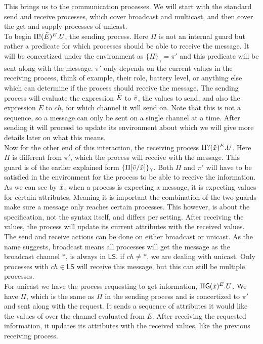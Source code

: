 This brings us to the communication processes. We will start with the standard send and receive processes, which cover broadcast and multicast, and then cover the get and supply processes of unicast.\\
To begin $\Pi ! (\Tilde{E})^{E}.U$, the sending process. Here $\Pi$ is not an internal guard but rather a predicate for which processes should be able to receive the message. It will be concertized under the environment as $\{ \Pi \}_{\gamma} = \pi'$ and this predicate will be sent along with the message. $\pi '$ only depends on the current values in the receiving process, think of example, their role, battery level, or anything else which can determine if the process should receive the message. The sending process will evaluate the expression $\Tilde{E}$ to $\Tilde{v}$, the values to send, and also the expression $E$ to $ch$, for which channel it will send on. Note that this is not a sequence, so a message can only be sent on a single channel at a time. After sending it will proceed to update its environment about which we will give more details later on what this means.\\
Now for the other end of this interaction, the receiving process $\Pi ? (\Tilde{x})^{E}.U$. Here $\Pi$ is different from $\pi '$, which the process will receive with the message. This guard is of the earlier explained form $\{ \Pi [\Tilde{v}/ \Tilde{x}] \}_{\gamma}$. Both $\Pi$ and $\pi '$ will have to be satisfied in the environment for the process to be able to receive the information. As we can see by $\Tilde{x}$, when a process is expecting a message, it is expecting values for certain attributes. Meaning it is important the combination of the two guards make sure a message only reaches certain processes. This however, is about the specification, not the syntax itself, and differs per setting. After receiving the values, the process will update its current attributes with the received values.\\
The send and receive actions can be done on either broadcast or unicast. As the name suggests, broadcast means all processes will get the message as the broadcast channel $*$, is always in $\mathsf{LS}$. if $ch \not = *$, we are dealing with unicast. Only processes with $ch \in \mathsf{LS}$ will receive this message, but this can still be multiple processes.\\
For unicast we have the process requesting to get information, $\Pi \mathsf{G}(\Tilde{x})^E.U$. We have $\Pi$, which is the same as $\Pi$ in the sending process and is concertized to $\pi '$ and sent along with the request. It sends a sequence of attributes it would like the values of over the channel evaluated from $E$. After receiving the requested information, it updates its attributes with the received values, like the previous receiving process.\\
